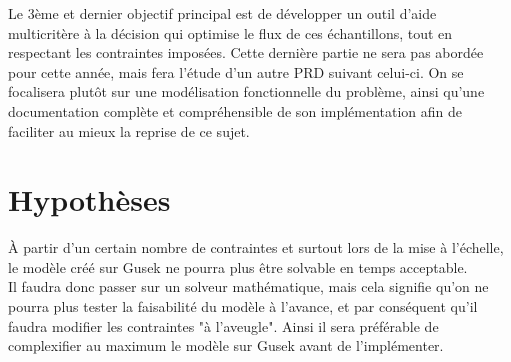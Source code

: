 \documentclass{polytech/polytech}
\numberwithin{figure}{chapter}
\begin{document}
\begin{flushleft}
Le 3ème et dernier objectif principal est de développer un outil d'aide multicritère à la décision qui optimise le flux de ces échantillons, tout en respectant les contraintes imposées.
Cette dernière partie ne sera pas abordée pour cette année, mais fera l'étude d'un autre PRD suivant celui-ci.
On se focalisera plutôt sur une modélisation fonctionnelle du problème, ainsi qu'une documentation complète et compréhensible de son implémentation afin de faciliter au mieux la reprise de ce sujet.  
\end{flushleft}

\section{Hypothèses}

À partir d'un certain nombre de contraintes et surtout lors de la mise à l'échelle, le modèle créé sur Gusek ne pourra plus être solvable en temps acceptable.\\
Il faudra donc passer sur un solveur mathématique, mais cela signifie qu'on ne pourra plus tester la faisabilité du modèle à l'avance, et par conséquent qu'il faudra modifier les contraintes "à l'aveugle". Ainsi il sera préférable de complexifier au maximum le modèle sur Gusek avant de l'implémenter.
\pagebreak
\end{document}
